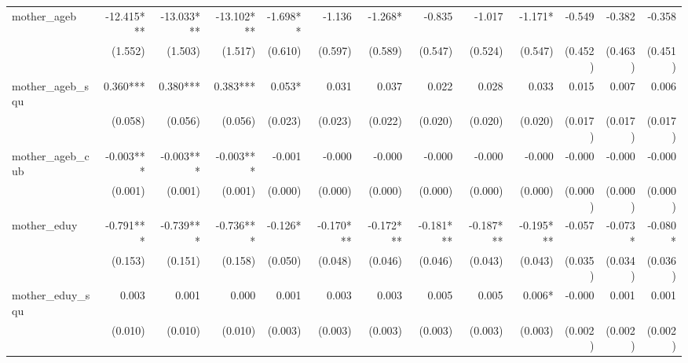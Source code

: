\begin{tabular}{lrrrrrrrrrrrr}
mother\_ageb                                &   -12.415*** &   -13.033*** &   -13.102*** &     -1.698** &       -1.136 &      -1.268* &       -0.835 &       -1.017 &      -1.171* &       -0.549 &       -0.382 &       -0.358 \\ 
                                            &      (1.552) &      (1.503) &      (1.517) &      (0.610) &      (0.597) &      (0.589) &      (0.547) &      (0.524) &      (0.547) &      (0.452) &      (0.463) &      (0.451) \\ 
mother\_ageb\_squ                           &     0.360*** &     0.380*** &     0.383*** &       0.053* &        0.031 &        0.037 &        0.022 &        0.028 &        0.033 &        0.015 &        0.007 &        0.006 \\ 
                                            &      (0.058) &      (0.056) &      (0.056) &      (0.023) &      (0.023) &      (0.022) &      (0.020) &      (0.020) &      (0.020) &      (0.017) &      (0.017) &      (0.017) \\ 
mother\_ageb\_cub                           &    -0.003*** &    -0.003*** &    -0.003*** &       -0.001 &       -0.000 &       -0.000 &       -0.000 &       -0.000 &       -0.000 &       -0.000 &       -0.000 &       -0.000 \\ 
                                            &      (0.001) &      (0.001) &      (0.001) &      (0.000) &      (0.000) &      (0.000) &      (0.000) &      (0.000) &      (0.000) &      (0.000) &      (0.000) &      (0.000) \\ 
mother\_eduy                                &    -0.791*** &    -0.739*** &    -0.736*** &      -0.126* &    -0.170*** &    -0.172*** &    -0.181*** &    -0.187*** &    -0.195*** &       -0.057 &      -0.073* &      -0.080* \\ 
                                            &      (0.153) &      (0.151) &      (0.158) &      (0.050) &      (0.048) &      (0.046) &      (0.046) &      (0.043) &      (0.043) &      (0.035) &      (0.034) &      (0.036) \\ 
mother\_eduy\_squ                           &        0.003 &        0.001 &        0.000 &        0.001 &        0.003 &        0.003 &        0.005 &        0.005 &       0.006* &       -0.000 &        0.001 &        0.001 \\ 
                                            &      (0.010) &      (0.010) &      (0.010) &      (0.003) &      (0.003) &      (0.003) &      (0.003) &      (0.003) &      (0.003) &      (0.002) &      (0.002) &      (0.002) \\ 

\end{tabular}
